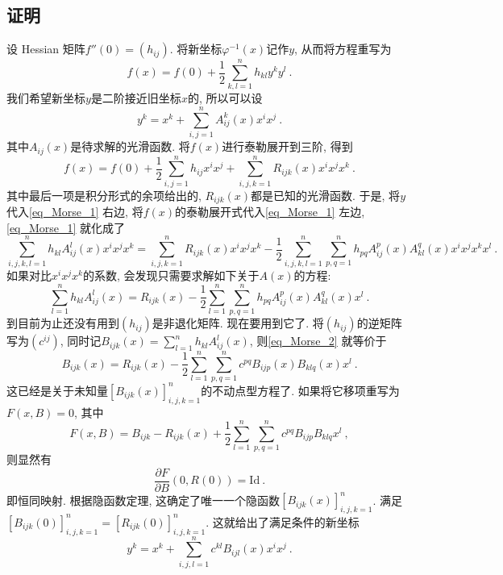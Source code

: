 \subsection{证明}
设 Hessian 矩阵$f''(0)=(h_{ij})$. 将新坐标$\varphi^{-1}(x)$记作$y$, 从而将方程重写为
\begin{equation}\label{eq_Morse_1}
f(x)=f(0)+\frac{1}{2}\sum_{k,l=1}^nh_{kl}y^ky^l~.
\end{equation}
我们希望新坐标$y$是二阶接近旧坐标$x$的, 所以可以设
$$
y^k
=x^k+\sum_{i,j=1}^nA^k_{ij}(x)x^ix^j~.
$$
其中$A_{ij}(x)$是待求解的光滑函数. 将$f(x)$进行泰勒展开到三阶, 得到
$$
f(x)=f(0)+\frac{1}{2}\sum_{i,j=1}^nh_{ij}x^ix^j+
\sum_{i,j,k=1}^nR_{ijk}(x)x^ix^jx^k~.
$$
其中最后一项是积分形式的余项给出的, $R_{ijk}(x)$都是已知的光滑函数. 于是, 将$y$代入\autoref{eq_Morse_1} 右边, 将$f(x)$的泰勒展开式代入\autoref{eq_Morse_1} 左边, \autoref{eq_Morse_1} 就化成了
$$
\sum_{i,j,k,l=1}^nh_{kl}A^l_{ij}(x)x^ix^jx^k
=\sum_{i,j,k=1}^nR_{ijk}(x)x^ix^jx^k
-\frac{1}{2}\sum_{i,j,k,l=1}^n\sum_{p,q=1}^nh_{pq}A^p_{ij}(x)A^q_{kl}(x)x^ix^jx^kx^l~.
$$
如果对比$x^ix^jx^k$的系数, 会发现只需要求解如下关于$A(x)$的方程:
\begin{equation}\label{eq_Morse_2}
\sum_{l=1}^nh_{kl}A^l_{ij}(x)
=R_{ijk}(x)
-\frac{1}{2}\sum_{l=1}^n\sum_{p,q=1}^nh_{pq}A^p_{ij}(x)A^q_{kl}(x)x^l~.
\end{equation}
到目前为止还没有用到$(h_{ij})$是非退化矩阵. 现在要用到它了. 将$(h_{ij})$的逆矩阵写为$(c^{ij})$, 同时记$B_{ijk}(x)=\sum_{l=1}^nh_{kl}A^l_{ij}(x)$, 则\autoref{eq_Morse_2} 就等价于
$$
B_{ijk}(x)
=R_{ijk}(x)-\frac{1}{2}\sum_{l=1}^n\sum_{p,q=1}^nc^{pq}B_{ijp}(x)B_{klq}(x)x^l~.
$$
这已经是关于未知量$[B_{ijk}(x)]_{i,j,k=1}^n$的不动点型方程了. 如果将它移项重写为$F(x,B)=0$, 其中
$$
F(x,B)=B_{ijk}-R_{ijk}(x)+\frac{1}{2}\sum_{l=1}^n\sum_{p,q=1}^nc^{pq}B_{ijp}B_{klq}x^l~,
$$
则显然有
$$
\frac{\partial F}{\partial B}(0,R(0))=\mathrm{Id}~.
$$
即恒同映射. 根据隐函数定理, 这确定了唯一一个隐函数$[B_{ijk}(x)]_{i,j,k=1}^n$. 满足$[B_{ijk}(0)]_{i,j,k=1}^n=[R_{ijk}(0)]_{i,j,k=1}^n$. 这就给出了满足条件的新坐标
$$
y^k
=x^k+\sum_{i,j,l=1}^nc^{kl}B_{ijl}(x)x^ix^j~.
$$ 